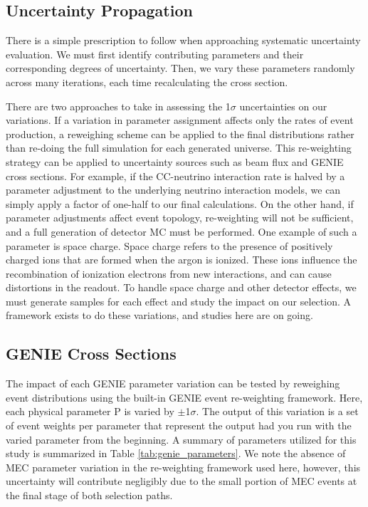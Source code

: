 \subsection{Uncertainty Propagation} 
There is a simple prescription to follow when approaching systematic uncertainty evaluation. We must first identify contributing parameters and their corresponding degrees of uncertainty.  Then, we vary these parameters randomly across many iterations, each time recalculating the cross section.
\par There are two approaches to take in assessing the 1$\sigma$ uncertainties on our variations. If a variation in parameter assignment affects only the rates of event production, a reweighing scheme can be applied to the final distributions rather than re-doing the full simulation for each generated universe.  This re-weighting strategy can be applied to uncertainty sources such as beam flux and GENIE cross sections.  For example, if the CC-neutrino interaction rate is halved by a parameter adjustment to the underlying neutrino interaction models, we can simply apply a factor of one-half to our final calculations.  On the other hand, if parameter adjustments affect event topology, re-weighting will not be sufficient, and a full generation of detector MC must be performed. One example of such a parameter is space charge. Space charge refers to the presence of positively charged ions that are formed when the argon is ionized.  These ions influence the recombination of ionization electrons from new interactions, and can cause distortions in the readout. To handle space charge and other detector effects, we must generate samples for each effect and study the impact on our selection. A framework exists to do these variations, and studies here are on going. %

\subsection{GENIE Cross Sections}
The impact of each GENIE parameter variation can be tested by reweighing event distributions using the built-in GENIE event re-weighting framework. Here, each physical parameter P is varied by $\pm$1$\sigma$. The output of this variation is a set of event weights per parameter that represent the output had you run with the varied parameter from the beginning. A summary of parameters utilized for this study is summarized in Table \ref{tab:genie_parameters}. We note the absence of MEC parameter variation in the re-weighting framework used here, however, this uncertainty will contribute negligibly due to the small portion of MEC events at the final stage of both selection paths.

